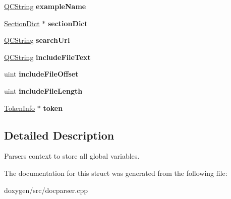 \begin{DoxyCompactItemize}
\mbox{\hyperlink{class_q_c_string}{Q\+C\+String}} {\bfseries example\+Name}
\item 
\mbox{\label{struct_doc_parser_context_a0e457c01f7cfa2b60d7af671cbf6fc9c}} 
\mbox{\hyperlink{class_section_dict}{Section\+Dict}} $\ast$ {\bfseries section\+Dict}
\item 
\mbox{\label{struct_doc_parser_context_aa2bfd37ddbdec7e8751e6585cc53beb8}} 
\mbox{\hyperlink{class_q_c_string}{Q\+C\+String}} {\bfseries search\+Url}
\item 
\mbox{\label{struct_doc_parser_context_a741637628985f24ccf69b051638804ca}} 
\mbox{\hyperlink{class_q_c_string}{Q\+C\+String}} {\bfseries include\+File\+Text}
\item 
\mbox{\label{struct_doc_parser_context_a8dca590b7e1548f62368aca98a1f8e5f}} 
uint {\bfseries include\+File\+Offset}
\item 
\mbox{\label{struct_doc_parser_context_ada8cb01b66567027d0799c5ce1e5dc2f}} 
uint {\bfseries include\+File\+Length}
\item 
\mbox{\label{struct_doc_parser_context_a8da54182d40bdc81e85cd29db88230b6}} 
\mbox{\hyperlink{struct_token_info}{Token\+Info}} $\ast$ {\bfseries token}
\end{DoxyCompactItemize}


\subsection{Detailed Description}
Parser\textquotesingle{}s context to store all global variables. 

The documentation for this struct was generated from the following file\+:\begin{DoxyCompactItemize}
\item 
doxygen/src/docparser.\+cpp\end{DoxyCompactItemize}
